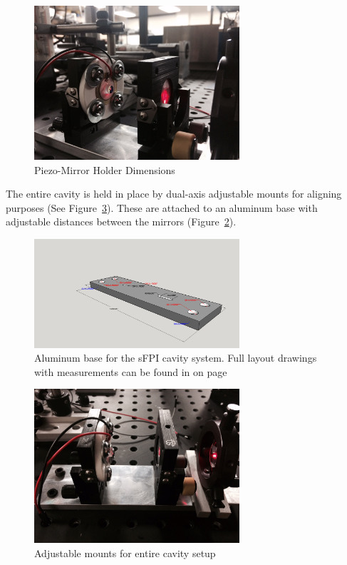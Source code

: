 \documentclass[12pt,journal]{IEEEtran}
\begin{document}
\begin{figure}[h!]
  \centering
	\includegraphics[width=3in]{second-surface-holder.png}
	\caption[Second-Surface Piezo-Mirror Holder]{Piezo-Mirror Holder Dimensions}
	\label{fig:holder}
\end{figure}

The entire cavity is held in place by dual-axis adjustable mounts for aligning purposes (See Figure~\ref{fig:full-cavity}). These are attached to an aluminum base with adjustable distances between the mirrors (Figure~\ref{fig:base}).

\begin{figure}[h!]
  \centering
	\includegraphics[width=3in]{./mechanical/sfpilensholder_3d_rep.png}
	\caption[Cavity Mounts]{Aluminum base for the sFPI cavity system. Full layout drawings with measurements can be found in on page~\pageref{ss:sfpilensholder}}
	\label{fig:base}
\end{figure}

\begin{figure}[h!]
  \centering
	\includegraphics[width=3in]{full-cavity.png}
	\caption[Cavity Mounts]{Adjustable mounts for entire cavity setup}
	\label{fig:full-cavity}
\end{figure}
\end{document}
